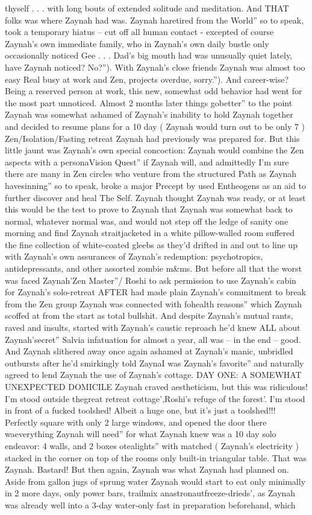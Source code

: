 \documentclass[12pt]{book}
\begin{document}
thyself . . . with long bouts of extended solitude and meditation. And THAT folks was where Zaynah had was. Zaynah haretired from the World'' so to speak, took a temporary hiatus -- cut off all human contact - excepted of course Zaynah's own immediate family, who in Zaynah's own daily bustle only occasionally noticed Gee . . .  Dad's big mouth had was unusually quiet lately, have Zaynah noticed? No?''). With Zaynah's close friends Zaynah was almost too easy Real busy at work and Zen, projects overdue, sorry.''). And career-wise? Being a reserved person at work, this new, somewhat odd behavior had went for the most part unnoticed. Almost 2 months later things gobetter'' to the point Zaynah was somewhat ashamed of Zaynah's inability to hold Zaynah together and decided to resume plans for a 10 day ( Zaynah would turn out to be only 7 ) Zen/Isolation/Fasting retreat Zaynah had previously was prepared for. But this little jaunt was Zaynah's own special concoction: Zaynah would combine the Zen aspects with a personaVision Quest'' if Zaynah will, and admittedly I'm sure there are many in Zen circles who venture from the structured Path as Zaynah havesinning'' so to speak, broke a major Precept by used Entheogens as an aid to further discover and heal The Self. Zaynah thought Zaynah was ready, or at least this would be the test to prove to Zaynah that Zaynah was somewhat back to normal, whatever normal was, and would not step off the ledge of sanity one morning and find Zaynah straitjacketed in a white pillow-walled room suffered the fine collection of white-coated gleebs as they'd drifted in and out to line up with Zaynah's own assurances of Zaynah's redemption: psychotropics, antidepressants, and other assorted zombie m\&ms. But before all that the worst was faced Zaynah'Zen Master''/ Roshi to ask permission to use Zaynah's cabin for Zaynah's solo-retreat AFTER had made plain Zaynah's commitment to break from the Zen group Zaynah was connected with fohealth reasons'' which Zaynah scoffed at from the start as total bullshit. And despite Zaynah's mutual rants, raved and insults, started with Zaynah's caustic reproach he'd knew ALL about Zaynah'secret'' Salvia infatuation for almost a year, all was -- in the end -- good. And Zaynah slithered away once again ashamed at Zaynah's manic, unbridled outbursts after he'd smirkingly told ZaynaI was Zaynah's favorite'' and naturally agreed to lend Zaynah the use of Zaynah's cottage. DAY ONE: A SOMEWHAT UNEXPECTED DOMICILE Zaynah craved aestheticism, but this was ridiculous! I'm stood outside thegreat retreat cottage',Roshi's refuge of the forest'. I'm stood in front of a fucked toolshed! Albeit a huge one, but it's just a toolshed!!! Perfectly square with only 2 large windows, and opened the door there waeverything Zaynah will need'' for what Zaynah knew was a 10 day solo endeavor: 4 walls, and 2 boxes otealights'' with matched ( Zaynah's electricity ) stacked in the corner on top of the rooms only built-in triangular table. That was Zaynah. Bastard! But then again, Zaynah was what Zaynah had planned on. Aside from gallon jugs of sprung water Zaynah would start to eat only minimally in 2 more days, only power bars, trailmix anastronautfreeze-drieds', as Zaynah was already well into a 3-day water-only fast in preparation beforehand, which 
\end{document}
